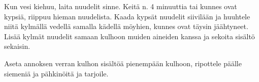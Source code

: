 \begin{recipe}
{        Kun vesi kiehuu, laita nuudelit sinne. Keitä n. 4 minuuttia tai kunnes ovat kypsiä, riippuu 
        hieman nuudelista. Kaada kypsät nuudelit siivilään ja huuhtele niitä kylmällä vedellä samalla 
        kädellä möyhien, kunnes ovat täysin jäähtyneet. Lisää kylmät nuudelit samaan kulhoon muiden 
        aineiden kanssa ja sekoita sisältö sekaisin. 

		Aseta annoksen verran kulhon sisältöä pienempään kulhoon, ripottele päälle siemeniä ja 
		pähkinöitä ja tarjoile.
    }
    
%    
%    
    
\end{recipe}

